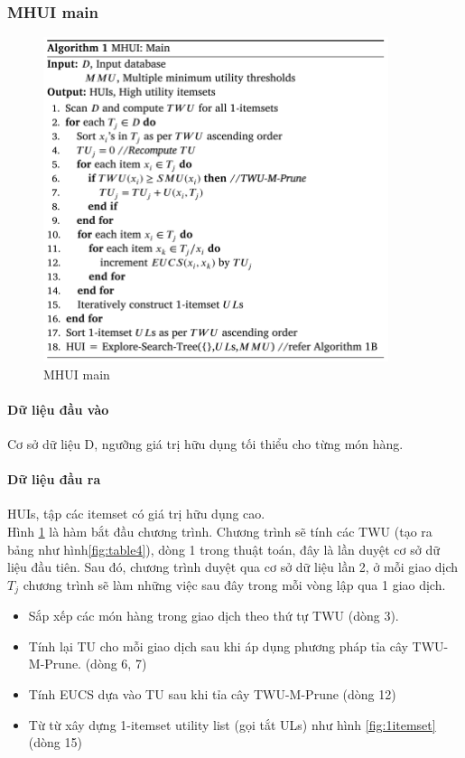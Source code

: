
\subsubsection{MHUI main}

\begin{figure}[ht]
\centering
\includegraphics[width=0.9\textwidth]{image/algo/algo1.PNG}
\caption{\label{fig:algo1} MHUI main}
\end{figure}

\paragraph{Dữ liệu đầu vào} Cơ sở dữ liệu D, ngưỡng giá trị hữu dụng tối thiểu cho từng món hàng.  
\paragraph{Dữ liệu đầu ra} HUIs, tập các itemset có giá trị hữu dụng cao.\\



Hình \ref{fig:algo1} là hàm bắt đầu chương trình. Chương trình sẽ tính các TWU (tạo ra bảng như hình\ref{fig:table4}), dòng 1 trong thuật toán, đây là lần duyệt cơ sở dữ liệu đầu tiên. Sau đó, chương trình duyệt qua cơ sở dữ liệu lần 2, ở mỗi giao dịch $T_j$ chương trình sẽ làm những việc sau đây trong mỗi vòng lập qua 1 giao dịch.

\begin{itemize}
  \item Sắp xếp các món hàng trong giao dịch theo thứ tự TWU (dòng 3). 
  \item Tính lại TU cho mỗi giao dịch sau khi áp dụng phương pháp tỉa cây TWU-M-Prune. (dòng 6, 7)
  \item Tính EUCS dựa vào TU sau khi tỉa cây TWU-M-Prune (dòng 12)
  \item Từ từ xây dựng 1-itemset utility list (gọi tắt ULs) như hình \ref{fig:1itemset} (dòng 15) 
\end{itemize}

